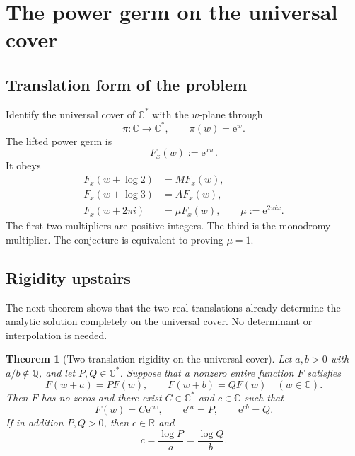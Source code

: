 \documentclass[11pt,oneside]{article}
\newtheorem{theorem}{Theorem}[section]
\theoremstyle{definition}
\theoremstyle{remark}
\newcommand{\Q}{\mathbb Q}
\newcommand{\R}{\mathbb R}
\newcommand{\C}{\mathbb C}
\newcommand{\e}{\mathrm e}
\begin{document}
\section{The power germ on the universal cover}

\subsection{Translation form of the problem}

Identify the universal cover of \(\C^*\) with the \(w\)-plane through
\[
  \pi:\C\longrightarrow\C^*,\qquad \pi(w)=\e^w.
\]
The lifted power germ is
\begin{equation}
  F_x(w):=\e^{xw}.
  \label{eq:Fx}
\end{equation}
It obeys
\begin{equation}
\begin{aligned}
  F_x(w+\log2)&=M F_x(w),\\
  F_x(w+\log3)&=A F_x(w),\\
  F_x(w+2\pi i)&=\mu F_x(w),\qquad \mu:=\e^{2\pi i x}.
\end{aligned}
\label{eq:three-translations}
\end{equation}
The first two multipliers are positive integers.  The third is the monodromy multiplier.  The conjecture is equivalent to proving \(\mu=1\).

\subsection{Rigidity upstairs}

The next theorem shows that the two real translations already determine the analytic solution completely on the universal cover.  No determinant or interpolation is needed.

\begin{theorem}[Two-translation rigidity on the universal cover]
\label{thm:upstairs}
Let \(a,b>0\) with \(a/b\notin\Q\), and let \(P,Q\in\C^*\).  Suppose that a nonzero entire function \(F\) satisfies
\begin{equation}
  F(w+a)=P F(w),\qquad F(w+b)=QF(w)
  \quad(w\in\C).
  \label{eq:general-shifts}
\end{equation}
Then \(F\) has no zeros and there exist \(C\in\C^*\) and \(c\in\C\) such that
\[
  F(w)=C\e^{cw},\qquad \e^{ca}=P,
  \qquad \e^{cb}=Q.
\]
If in addition \(P,Q>0\), then \(c\in\R\) and
\[
  c=\frac{\log P}{a}=\frac{\log Q}{b}.
\]
\end{theorem}
\end{document}
